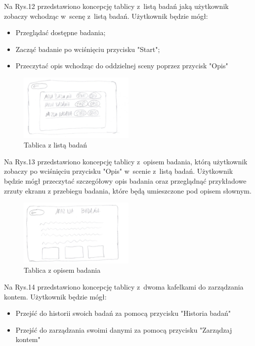 \documentclass[12pt, letterpaper]{article}
\begin{document}
		Na Rys.12 przedstawiono koncepcję tablicy z~listą badań jaką użytkownik zobaczy wchodząc w~scenę z~listą badań. Użytkownik będzie mógł:
		
		\begin{itemize}
			\item Przeglądać dostępne badania;
			\item Zacząć badanie po wciśnięciu przycisku "Start";
			\item Przeczytać opis wchodząc do oddzielnej sceny poprzez przycisk "Opis"
		\end{itemize}
		
\begin{figure}[h]
  \centering
      \includegraphics[width=0.5\textwidth]{GUI_lista_badan}
  \caption{Tablica z listą badań}
\end{figure}
		
		Na Rys.13 przedstawiono koncepcję tablicy z~opisem badania, którą użytkownik zobaczy po wciśnięciu przycisku "Opis" w~scenie z~listą badań. Użytkownik będzie mógł przeczytać szczegółowy opis badania oraz przeglądnąć przykładowe zrzuty ekranu z przebiegu badania, które będą umieszczone pod opisem słownym.
		
\begin{figure}[h]
  \centering
      \includegraphics[width=0.5\textwidth]{GUI_opis_badania}
  \caption{Tablica z opisem badania}
\end{figure}
		
		Na Rys.14 przedstawiono koncepcję tablicy z~dwoma kafelkami do zarządzania kontem. Użytkownik będzie mógł:
		
		\begin{itemize}
			\item Przejść do historii swoich badań za pomocą przycisku "Historia badań"
			\item Przejść do zarządzania swoimi danymi za pomocą przycisku "Zarządzaj kontem"
		\end{itemize}
\end{document}
